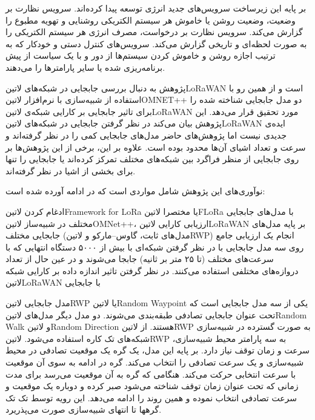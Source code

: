 بر پایه این زیرساخت سرویس‌های جدید انرژی توسعه پیدا کرده‌اند. سرویس نظارت بر وضعیت، وضعیت روشن یا خاموش هر سیستم الکتریکی روشنایی و تهویه مطبوع را
گزارش می‌کند. سرویس نظارت بر درخواست، مصرف انرژی هر سیستم الکتریکی را به صورت لحظه‌ای و تاریخی گزارش می‌کند. سرویس‌های کنترل دستی و خودکار که به ترتیب
اجازه روشن و خاموش کردن سیستم‌ها از دور و با یک سیاست از پیش برنامه‌ریزی شده یا سایر پارامترها را می‌دهند.


پژوهش  به دنبال بررسی جابجایی در شبکه‌های ‌لاتین{LoRaWAN} است و از همین رو با استفاده از شبیه‌سازی با نرم‌افزار ‌لاتین{OMNET++}
دو مدل جابجایی شناخته شده را برای تاثیر جابجایی بر کارایی شبکه‌ی ‌لاتین{LoRaWAN} مورد تحقیق قرار می‌دهد. این پژوهش بیان می‌کند در نظر گرفتن جابجایی در شبکه‌های
‌لاتین{LoRaWAN} ایده‌ی جدیدی نیست اما پژوهش‌های حاضر مدل‌های جابجایی کمی را در نظر گرفته‌اند و سرعت و تعداد اشیای آن‌ها محدود بوده است.
علاوه بر این، برخی از این پژوهش‌ها بر روی جابجایی از منظر فراگرد بین شبکه‌های مختلف تمرکز کرده‌اند یا جابجایی را تنها برای بخشی از اشیا در نظر گرفته‌اند.

نوآوری‌های این پژوهش شامل مواردی است که در ادامه آورده شده است:

 ادغام کردن ‌لاتین{Framework for LoRa} یا مختصرا ‌لاتین{FLoRa} با مدل‌های جابجایی مختلف در شبیه‌ساز ‌لاتین{OMNet++}،
 ارزیابی کارایی ‌لاتین{LoRaWAN} بر پایه مدل‌های جابجایی مختلف (مدل‌های ثابت، گاوس--مارکو و ‌لاتین{RWP})
 انجام یک ارزیابی جامع روی سه مدل جابجایی با در نظر گرفتن شبکه‌ای با بیش از ۵۰۰۰ دستگاه انتهایی که با سرعت‌های مختلف (تا ۲۵ متر بر ثانیه) جابجا می‌شوند و در عین حال از تعداد
دروازه‌های مختلفی استفاده می‌کنند.
 در نظر گرفتن تاثیر اندازه داده بر کارایی شبکه ‌لاتین{LoRaWAN} با جابجایی

مدل جابجایی ‌لاتین{RWP} یا ‌لاتین{Random Waypoint} یکی از سه مدل جابجایی است که تحت عنوان جابجایی تصادفی طبقه‌بندی می‌شوند.
دو مدل دیگر مدل‌های ‌لاتین{Random Walk} و ‌لاتین{Random Direction} هستند.
از ‌لاتین{RWP} به صورت گسترده در شبیه‌سازی شبکه‌های تک کاره استفاده می‌شود.
‌لاتین{RWP} به سه پارامتر محیط شبیه‌سازی، سرعت و زمان توقف نیاز دارد.
بر پایه این مدل، یک گره یک موقعیت تصادفی در محیط شبیه‌سازی و یک سرعت تصادفی را انتخاب می‌کند.
گره در ادامه به سوی آن موقعیت با سرعت انتخابی حرکت می‌کند. هنگامی که گره به آن موقعیت می‌رسد برای مدت زمانی که تحت عنوان زمان توقف
شناخته می‌شود صبر کرده و دوباره یک موقعیت و سرعت تصادفی انتخاب نموده و همین روند را ادامه می‌دهد. این رویه توسط تک تک گرهها تا انتهای
شبیه‌سازی صورت می‌پذریرد.


